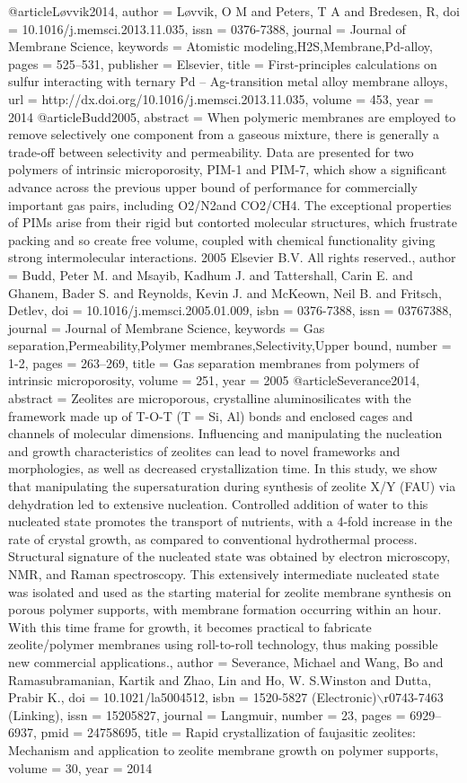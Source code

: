 @article{Løvvik2014,
author = {L{\o}vvik, O M and Peters, T A and Bredesen, R},
doi = {10.1016/j.memsci.2013.11.035},
issn = {0376-7388},
journal = {Journal of Membrane Science},
keywords = {Atomistic modeling,H2S,Membrane,Pd-alloy},
pages = {525--531},
publisher = {Elsevier},
title = {{First-principles calculations on sulfur interacting with ternary Pd – Ag-transition metal alloy membrane alloys}},
url = {http://dx.doi.org/10.1016/j.memsci.2013.11.035},
volume = {453},
year = {2014}
}
@article{Budd2005,
abstract = {When polymeric membranes are employed to remove selectively one component from a gaseous mixture, there is generally a trade-off between selectivity and permeability. Data are presented for two polymers of intrinsic microporosity, PIM-1 and PIM-7, which show a significant advance across the previous upper bound of performance for commercially important gas pairs, including O2/N2and CO2/CH4. The exceptional properties of PIMs arise from their rigid but contorted molecular structures, which frustrate packing and so create free volume, coupled with chemical functionality giving strong intermolecular interactions. {\textcopyright} 2005 Elsevier B.V. All rights reserved.},
author = {Budd, Peter M. and Msayib, Kadhum J. and Tattershall, Carin E. and Ghanem, Bader S. and Reynolds, Kevin J. and McKeown, Neil B. and Fritsch, Detlev},
doi = {10.1016/j.memsci.2005.01.009},
isbn = {0376-7388},
issn = {03767388},
journal = {Journal of Membrane Science},
keywords = {Gas separation,Permeability,Polymer membranes,Selectivity,Upper bound},
number = {1-2},
pages = {263--269},
title = {{Gas separation membranes from polymers of intrinsic microporosity}},
volume = {251},
year = {2005}
}
@article{Severance2014,
abstract = {Zeolites are microporous, crystalline aluminosilicates with the framework made up of T-O-T (T = Si, Al) bonds and enclosed cages and channels of molecular dimensions. Influencing and manipulating the nucleation and growth characteristics of zeolites can lead to novel frameworks and morphologies, as well as decreased crystallization time. In this study, we show that manipulating the supersaturation during synthesis of zeolite X/Y (FAU) via dehydration led to extensive nucleation. Controlled addition of water to this nucleated state promotes the transport of nutrients, with a 4-fold increase in the rate of crystal growth, as compared to conventional hydrothermal process. Structural signature of the nucleated state was obtained by electron microscopy, NMR, and Raman spectroscopy. This extensively intermediate nucleated state was isolated and used as the starting material for zeolite membrane synthesis on porous polymer supports, with membrane formation occurring within an hour. With this time frame for growth, it becomes practical to fabricate zeolite/polymer membranes using roll-to-roll technology, thus making possible new commercial applications.},
author = {Severance, Michael and Wang, Bo and Ramasubramanian, Kartik and Zhao, Lin and Ho, W. S.Winston and Dutta, Prabir K.},
doi = {10.1021/la5004512},
isbn = {1520-5827 (Electronic)$\backslash$r0743-7463 (Linking)},
issn = {15205827},
journal = {Langmuir},
number = {23},
pages = {6929--6937},
pmid = {24758695},
title = {{Rapid crystallization of faujasitic zeolites: Mechanism and application to zeolite membrane growth on polymer supports}},
volume = {30},
year = {2014}
}
